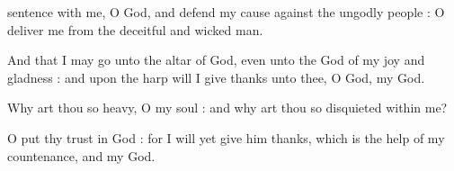  sentence with me, O God, and defend my cause against the ungodly people : O deliver me from the deceitful and wicked man.\par
{}
And that I may go unto the altar of God, even unto the God of my joy and gladness : and upon the harp will I give thanks unto thee, O God, my God.\par
{}Why art thou so heavy, O my soul : and why art thou so disquieted within me?\par
{}O put thy trust in God : for I will yet give him thanks, which is the help of my countenance, and my God.\par



